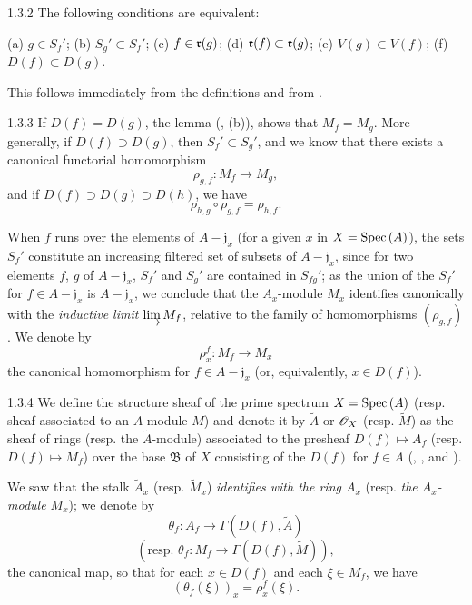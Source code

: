 \begin{envs}[Lemma]{1.3.2}
\label{lem-1.1.3.2}
The following conditions are equivalent:
\begin{center}
\rm{(a)} $g\in S_f'$;
\rm{(b)} $S_g'\subset S_f'$;
\rm{(c)} $f\in\mathfrak{r}(g)$;
\rm{(d)} $\mathfrak{r}(f)\subset\mathfrak{r}(g)$;
\rm{(e)} $V(g)\subset V(f)$;
\rm{(f)} $D(f)\subset D(g)$.
\end{center}
\end{envs}
This follows immediately from the definitions and from .

\begin{env}{1.3.3}
\label{env-1.1.3.3}
If $D(f)=D(g)$, the lemma (, (b)), shows that $M_f=M_g$. More generally, if
$D(f)\supset D(g)$, then $S_f'\subset S_g'$, and we know  that there exists
a canonical functorial homomorphism
\[
  \rho_{g,f}:M_f\longrightarrow M_g,
\]
and if $D(f)\supset D(g)\supset D(h)$, we have 
\[
  \rho_{h,g}\circ\rho_{g,f}=\rho_{h,f}.
  \tag{1.3.3.1}
\]
\end{env}

When $f$ runs over the elements of $A-\mathfrak{j}_x$ (for a given $x$ in $X={\mathop{\mathrm{Spec}}\nolimits}\,(A)$), the
sets $S_f'$ constitute an increasing filtered set of subsets of $A-\mathfrak{j}_x$, since for
two elements $f$, $g$ of $A-\mathfrak{j}_x$, $S_f'$ and $S_g'$ are contained in $S_{fg}'$; as
the union of the $S_f'$ for $f\in A-\mathfrak{j}_x$ is $A-\mathfrak{j}_x$, we conclude
 that the $A_x$-module $M_x$ identifies canonically with the \emph{inductive
limit} $\varinjlim M_f$, relative to the family of homomorphisms $(\rho_{g,f})$. We denote by
\[
  \rho_x^f:M_f\longrightarrow M_x
\]
the canonical homomorphism for $f\in A-\mathfrak{j}_x$ (or, equivalently, $x\in D(f)$).

\begin{envs}[Definition]{1.3.4}
\label{defn-1.1.3.4}
We define the structure sheaf of the prime spectrum $X={\mathop{\mathrm{Spec}}\nolimits}\,(A)$ (resp. sheaf associated to
an $A$-module $M$) and denote it by $\widetilde{A}$ or $\mathscr{O}_X$ (resp. $\widetilde{M}$) as the
sheaf of rings (resp. the $\widetilde{A}$-module) associated to the presheaf
$D(f)\mapsto A_f$ (resp. $D(f)\mapsto M_f$) over the base $\mathfrak{B}$ of $X$ consisting
of the $D(f)$ for $f\in A$ (, , and ).
\end{envs}

We saw  that the stalk $\widetilde{A}_x$ (resp. $\widetilde{M}_x$)
\emph{identifies with the ring $A_x$} (resp. \emph{the $A_x$-module $M_x$}); we denote by
\[
  \theta_f:A_f\longrightarrow\Gamma(D(f),\widetilde{A})
\]
\[
  (\text{resp. }\theta_f:M_f\longrightarrow\Gamma(D(f),\widetilde{M})),
\]
the canonical map, so that for each $x\in D(f)$ and each $\xi\in M_f$, we have
\[
  (\theta_f(\xi))_x=\rho_x^f(\xi).
  \tag{1.3.4.1}
\]

